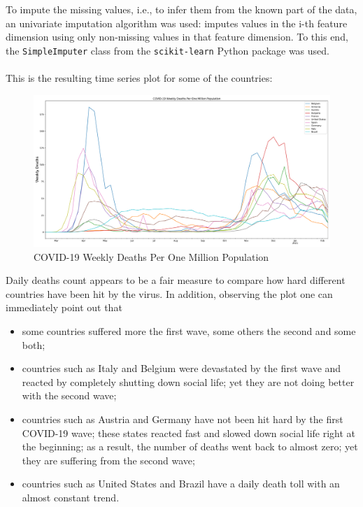 \documentclass[11pt,a4paper]{article}
\begin{document}
To impute the missing values, i.e., to infer them from the known part of the
data, an univariate imputation algorithm was used: imputes values in the
i-th feature dimension using only non-missing values in that feature dimension.
To this end, the \texttt{SimpleImputer} class from the \texttt{scikit-learn}
Python package was used.\\
\\
This is the resulting time series plot for some of the countries:
\begin{figure}[H]
    \begin{center}
        \hspace*{-0.3cm}
        \includegraphics[scale=0.325]{img/weekly-deaths-per-million.pdf}
    \end{center}
    \caption{COVID-19 Weekly Deaths Per One Million Population}
\end{figure}
\noindent Daily deaths count appears to be a fair measure to compare how hard
different countries have been hit by the virus. In addition, observing the plot
one can immediately point out that
\begin{itemize}
    \item some countries suffered more the first wave, some others the second
    and some both;
    \item countries such as {\color{ts_italy}Italy} and
    {\color{ts_belgium}Belgium} were devastated by the first wave and reacted
    by completely shutting down social life; yet they are not doing better with
    the second wave;
    \item countries such as {\color{ts_austria}Austria} and
    {\color{ts_germany}Germany} have not been hit hard by the first COVID-19
    wave; these states reacted fast and slowed down social life right at the
    beginning; as a result, the number of deaths went back to almost zero; yet
    they are suffering from the second wave;
    \item countries such as {\color{ts_unitedstates}United States} and
    {\color{cyan}Brazil} have a daily death toll with an almost constant
    trend.
\end{itemize}
\end{document}
